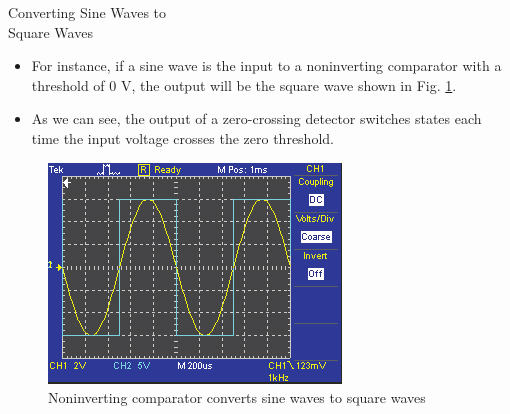 \documentclass[pdflatex,compress]{beamer}
\begin{document}
\begin{frame}{Converting Sine Waves to\\Square Waves}
	\begin{multicols}{2}
		\begin{itemize}
			\item For instance, if a sine wave is the input to a noninverting comparator with a threshold of 0 V, the output will be the square wave shown in Fig. \ref{fig:img06}.
			\item As we can see, the output of a zero-crossing detector switches states each time the input voltage crosses the zero threshold.
		\end{itemize}
		\columnbreak
		\begin{figure}
			\centering
			\includegraphics[width=\linewidth]{img/img06}
			\caption{Noninverting comparator converts sine waves to square waves}
			\label{fig:img06}
		\end{figure}
	\end{multicols}
\end{frame}
\end{document}
